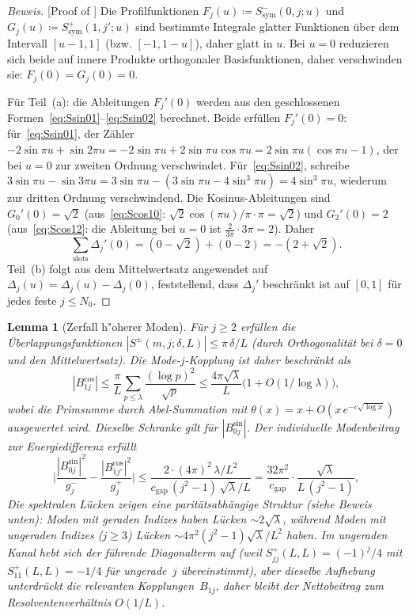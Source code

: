 ﻿\documentclass[12pt,a4paper]{article}
\newtheorem{lemma}[theorem]{Lemma}
\theoremstyle{definition}
\theoremstyle{remark}
\begin{document}
\begin{proof}[Beweis][Proof of ]
Die Profilfunktionen $F_j(u) \coloneqq S^-_{\mathrm{sym}}(0,j;u)$ und $G_j(u) \coloneqq S^+_{\mathrm{sym}}(1,j';u)$ sind bestimmte Integrale glatter Funktionen über dem Intervall $[u-1,1]$ (bzw. $[-1,1-u]$), daher glatt in $u$. Bei $u = 0$ reduzieren sich beide auf innere Produkte orthogonaler Basisfunktionen, daher verschwinden sie: $F_j(0) = G_j(0) = 0$.

Für Teil~(a): die Ableitungen $F_j'(0)$ werden aus den geschlossenen Formen~\eqref{eq:Ssin01}--\eqref{eq:Ssin02} berechnet. Beide erfüllen $F_j'(0) = 0$: für~\eqref{eq:Ssin01}, der Zähler $-2\sin\pi u + \sin 2\pi u = -2\sin\pi u + 2\sin\pi u\cos\pi u = 2\sin\pi u(\cos\pi u - 1)$, der bei $u = 0$ zur zweiten Ordnung verschwindet. Für~\eqref{eq:Ssin02}, schreibe $3\sin\pi u - \sin 3\pi u = 3\sin\pi u - (3\sin\pi u - 4\sin^3\pi u) = 4\sin^3\pi u$, wiederum zur dritten Ordnung verschwindend. Die Kosinus-Ableitungen sind $G_0'(0) = \sqrt{2}$ (aus~\eqref{eq:Scos10}: $\sqrt{2}\cos(\pi u)/\pi \cdot \pi = \sqrt{2}$) und $G_2'(0) = 2$ (aus~\eqref{eq:Scos12}: die Ableitung bei $u = 0$ ist $\tfrac{2}{3\pi}\cdot 3\pi = 2$). Daher
\[
  \sum_{\mathrm{slots}} \Delta_j'(0) = (0 - \sqrt{2}) + (0 - 2) = -(2 + \sqrt{2}).
\]
Teil~(b) folgt aus dem Mittelwertsatz angewendet auf $\Delta_j(u) = \Delta_j(u) - \Delta_j(0)$, feststellend, dass $\Delta_j'$ beschränkt ist auf $[0,1]$ für jedes feste $j \leq N_0$.
\end{proof}

\begin{lemma}[Zerfall h"oherer Moden]
\label{lem:higher-mode-decay}
Für $j \geq 2$ erfüllen die Überlappungsfunktionen $|S^{\pm}(m,j;\delta,L)| \leq \pi\,\delta/L$ (durch Orthogonalität bei $\delta = 0$ und den Mittelwertsatz). Die Mode-$j$-Kopplung ist daher beschränkt als
\[
  |B_{1j}^{\cos}| \leq \frac{\pi}{L}\sum_{p \leq \lambda}\frac{(\log p)^2}{\sqrt{p}}
  \leq \frac{4\pi\sqrt{\lambda}}{L}\bigl(1 + O(1/\log\lambda)\bigr),
\]
wobei die Primsumme durch Abel-Summation mit $\theta(x) = x + O(x\,e^{-c\sqrt{\log x}})$ ausgewertet wird. Dieselbe Schranke gilt für $|B_{0j}^{\sin}|$. Der individuelle Modenbeitrag zur Energiedifferenz erfüllt
\[
  \biggl|\frac{|B_{0j}^{\sin}|^2}{g_j^-} - \frac{|B_{1j'}^{\cos}|^2}{g_j^+}\biggr|
  \leq \frac{2 \cdot (4\pi)^2 \,\lambda/L^2}{c_{\mathrm{gap}}\,(j^2-1)\,\sqrt{\lambda}/L}
  = \frac{32\pi^2}{c_{\mathrm{gap}}}\cdot\frac{\sqrt{\lambda}}{L\,(j^2-1)},
\]
Die spektralen Lücken zeigen eine \emph{paritätsabhängige} Struktur (siehe Beweis unten): Moden mit geraden Indizes haben Lücken $\sim 2\sqrt{\lambda}$, während Moden mit ungeraden Indizes ($j \geq 3$) Lücken $\sim 4\pi^2(j^2-1)\sqrt{\lambda}/L^2$ haben. Im ungeraden Kanal hebt sich der führende Diagonalterm auf (weil $S_{jj}^+(L,L) = (-1)^j/4$ mit $S_{11}^+(L,L) = -1/4$ für ungerade~$j$ übereinstimmt), aber dieselbe Aufhebung unterdrückt die relevanten Kopplungen~$B_{1j}$, daher bleibt der Nettobeitrag zum Resolventenverhältnis $O(1/L)$.
\end{lemma}
\end{document}
